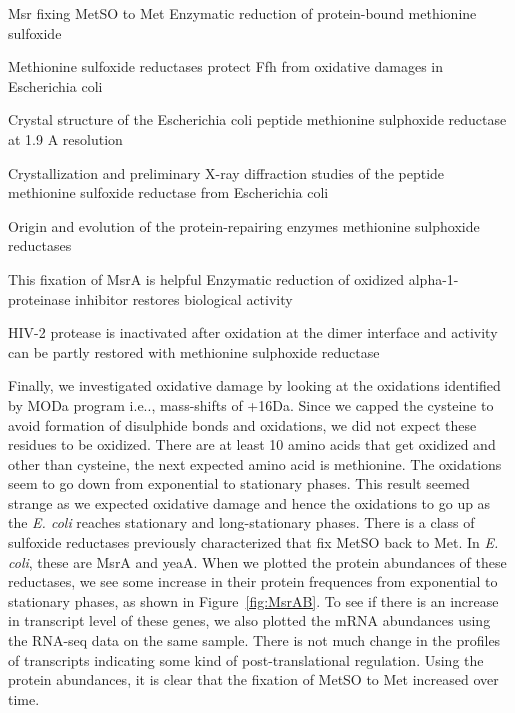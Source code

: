 \documentclass[12pt]{article}
\begin{document}
Msr fixing MetSO to Met \cite{Brotetal1981}
{Enzymatic reduction of protein-bound methionine sulfoxide}

\cite{Ezratyetal2004}
{Methionine sulfoxide reductases protect Ffh from oxidative damages in Escherichia coli}

\cite{Tete-Favieretal2000}
{Crystal structure of the Escherichia coli peptide methionine sulphoxide reductase at 1.9 A resolution}
   
\cite{Tete-Favieretal2000b}
{Crystallization and preliminary X-ray diffraction studies of the peptide methionine sulfoxide reductase from Escherichia coli}
   
\cite{ZhangWeissbach2008}
{Origin and evolution of the protein-repairing enzymes methionine sulphoxide reductases}
   
This fixation of MsrA is helpful \cite{Abramsetal1981}
{Enzymatic reduction of oxidized alpha-1-proteinase inhibitor restores biological activity}

\cite{Davisetal2000}
{HIV-2 protease is inactivated after oxidation at the dimer interface and activity can be partly restored with methionine sulphoxide reductase}

Finally, we investigated oxidative damage by looking at the oxidations identified by MODa program i.e.., mass-shifts of +16Da. Since we capped the cysteine to avoid formation of disulphide bonds and oxidations, we did not expect these residues to be oxidized. There are at least 10 amino acids that get oxidized and other than cysteine, the next expected amino acid is methionine. The oxidations seem to go down from exponential to stationary phases. This result seemed strange as we expected oxidative damage and hence the oxidations to go up as the \emph{E. coli} reaches stationary and long-stationary phases. There is a class of sulfoxide reductases previously characterized that fix MetSO back to Met. In \emph{E. coli}, these are MsrA and yeaA. When we plotted the protein abundances of these reductases, we see some increase in their protein frequences from exponential to stationary phases, as shown in Figure~\ref{fig:MsrAB}. To see if there is an increase in transcript level of these genes, we also plotted the mRNA abundances using the RNA-seq data on the same sample. There is not much change in the profiles of transcripts indicating some kind of post-translational regulation. Using the protein abundances, it is clear that the fixation of MetSO to Met increased over time.

\end{document}
